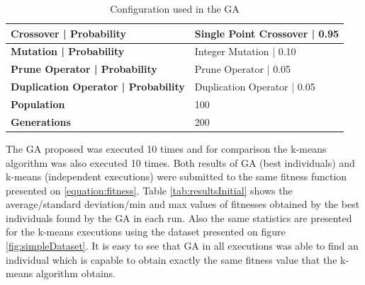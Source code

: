 \documentclass[journal]{IEEEtran}
\begin{document}
\begin{table}[]
	\centering
	\caption{Configuration used in the GA}
	\label{ga-configuration}
	\begin{tabular}{|l|l|}
		\hline
		\textbf{Crossover  |  Probability}         & Single Point Crossover | 0.95     \\ \hline
		\textbf{Mutation | Probability}            & Integer Mutation          |  0.10 \\ \hline
		\textbf{Prune Operator | Probability}      & Prune Operator           | 0.05   \\ \hline
		\textbf{Duplication Operator | Probability} & Duplication Operator   | 0.05     \\ \hline
		\textbf{Population}                        & 100                               \\ \hline
		\textbf{Generations}                       & 200                               \\ \hline
	\end{tabular}
\end{table}


The GA proposed was executed 10 times and for comparison the k-means algorithm was also executed 10 times. Both results of GA (best individuals) and k-means (independent executions) were submitted to the same fitness function presented on \ref{equation:fitness}. Table \ref{tab:resultsInitial}
shows the average/standard deviation/min and max values of fitnesses obtained by the best individuals found by the GA in each run. Also the same statistics are presented for the k-means executions using the dataset presented on figure \ref{fig:simpleDataset}.
It is easy to see that GA in all executions was able to find an individual which is capable to obtain exactly the same fitness value that the k-means algorithm obtains. 
\end{document}
